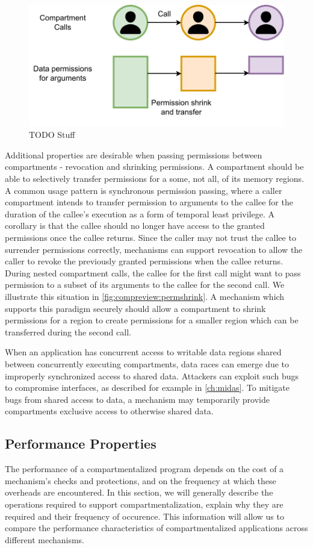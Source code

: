 \begin{figure}
      \centering
      \includegraphics[width=0.75\linewidth]{media/compreview/permission_shrink_grant.pdf}
      \caption{TODO Stuff}
      \label{fig:compreview:permshrink}
\end{figure}
Additional properties are desirable when passing
permissions between compartments - revocation and shrinking permissions.
A compartment should be able to selectively transfer permissions for a 
some, not all, of its memory regions.
A common usage pattern is synchronous permission passing, where a caller
compartment intends to transfer permission to arguments to the callee for the
duration of the callee's execution as a form of temporal least privilege.
A corollary is that the callee should no longer have access to the granted
permissions once the callee returns.
Since the caller may not trust the callee to surrender permissions correctly, 
mechanisms can support revocation to allow the caller to revoke the previously
granted permissions when the callee returns.
During nested compartment calls, the callee for the first call might want to pass
permission to a subset of its arguments to the callee for the second call.
We illustrate this situation in \autoref{fig:compreview:permshrink}.
A mechanism which supports this paradigm securely should allow a compartment to
shrink permissions for a region to create permissions for a smaller region
which can be transferred during the second call. 

When an application has concurrent access to writable data regions shared 
between concurrently executing compartments, data races can emerge due to
improperly synchronized access to shared data.
Attackers can exploit such bugs to compromise interfaces, as described for
example in \autoref{ch:midas}.
To mitigate bugs from shared access to data, a mechanism may temporarily provide
compartments exclusive access to otherwise shared data.

\subsection{Performance Properties}
The performance of a compartmentalized program depends on the cost of
a mechanism's checks and protections, and on the frequency at which these
overheads are encountered.
In this section, we will generally describe the operations required to
support compartmentalization, explain why they are required and their
frequency of occurence. 
This information will allow us to compare the performance characteristics
of compartmentalized applications across different mechanisms.

